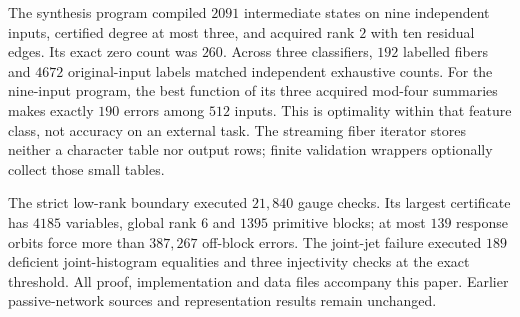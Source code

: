 \documentclass[11pt,a4paper]{article}
\begin{document}
The synthesis program compiled $2091$ intermediate states on
nine independent inputs, certified degree at most three,
and acquired rank $2$ with ten residual edges. Its exact
zero count was $260$. Across three classifiers, $192$
labelled fibers and $4672$ original-input labels matched
independent exhaustive counts. For the nine-input program,
the best function of its three acquired mod-four summaries
makes exactly $190$ errors among $512$ inputs.
This is optimality within that feature class, not accuracy
on an external task. The streaming fiber iterator stores
neither a character table nor output rows; finite validation
wrappers optionally collect those small tables.

The strict low-rank boundary executed $21{,}840$ gauge checks.
Its largest certificate has $4185$ variables, global rank $6$
and $1395$ primitive blocks; at most $139$ response orbits
force more than $387{,}267$ off-block errors.
The joint-jet failure executed $189$ deficient joint-histogram
equalities and three injectivity checks at the exact threshold.
All proof, implementation and data files accompany this paper.
Earlier passive-network sources and representation results
remain unchanged.
\end{document}
